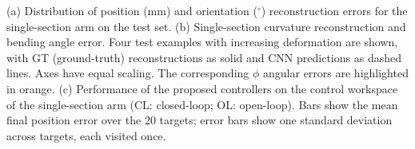 \caption{(a) Distribution of position (mm) and orientation ($^\circ$) reconstruction errors for the single-section arm on the test set. (b) Single-section curvature reconstruction and bending angle error. Four test examples with increasing deformation are shown, with GT (ground-truth) reconstructions as solid and CNN predictions as dashed lines. Axes have equal scaling. The corresponding $\phi$ angular errors are highlighted in orange. (c) Performance of the proposed controllers on the control workspace of the single-section arm (CL: closed-loop; OL: open-loop). Bars show the mean final position error over the 20 targets; error bars show one standard deviation across targets, each visited once.}

